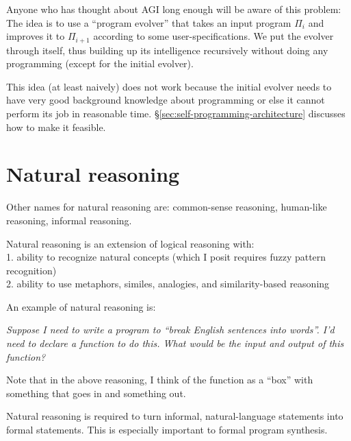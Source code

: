 Anyone who has thought about AGI long enough will be aware of this problem:  The idea is to use a ``program evolver'' that takes an input program $\Pi_i$ and improves it to $\Pi_{i+1}$ according to some user-specifications.  We put the evolver through itself, thus building up its intelligence recursively without doing any programming (except for the initial evolver).

This idea (at least naively) does not work because the initial evolver needs to have very good background knowledge about programming or else it cannot perform its job in reasonable time.  \S\ref{sec:self-programming-architecture} discusses how to make it feasible.

\section{Natural reasoning}
\label{sec:natural-reasoning}

Other names for natural reasoning are: common-sense reasoning, human-like reasoning, informal reasoning.

Natural reasoning is an extension of logical reasoning with:\\
1.  ability to recognize natural concepts (which I posit requires fuzzy pattern recognition)\\
2.  ability to use metaphors, similes, analogies, and similarity-based reasoning

An example of natural reasoning is:

\leftskip 1cm \textit{Suppose I need to write a program to ``break English sentences into words''.  I'd need to declare a function to do this.  What would be the input and output of this function?}

\leftskip 0cm Note that in the above reasoning, I think of the function as a ``box'' with something that goes in and something out.

Natural reasoning is required to turn informal, natural-language statements into formal statements.  This is especially important to formal program synthesis.

